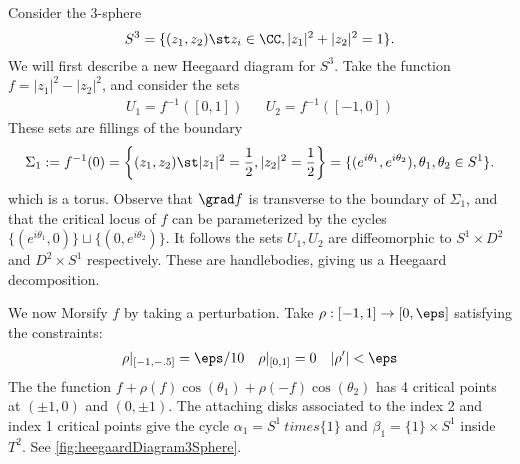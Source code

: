 

    Consider the 3-sphere 
    \[S^3=\{(z_1, z_2)\st z_i\in \CC, |z_1|^2+|z_2|^2=1\}.\]
    We will first describe a new Heegaard diagram for $S^3$. Take the function $f=|z_1|^2-|z_2|^2$, and consider the sets 
    \begin{align*}
        U_1=f^{-1}([0, 1]) && U_2=f^{-1}([-1, 0])
    \end{align*}
    These sets are fillings of the boundary 
    \[\Sigma_1:=f^{-1}(0)=\left\{(z_1, z_2)\st |z_1|^2=\frac{1}{2}, |z_2|^2=\frac{1}{2}\right\}=\{(e^{i\theta_1}, e^{i\theta_2}), \theta_1, \theta_2\in S^1\}.\]
    which is a torus. Observe that $\grad f$ is transverse to the boundary of $\Sigma_1$, and that the critical locus of $f$ can be parameterized by the cycles $\{(e^{i\theta_1}, 0)\}\sqcup \{(0, e^{i\theta_2})\}$. It follows the sets $U_1, U_2$ are diffeomorphic to $S^1\times D^2$ and $D^2\times S^1$ respectively. These are handlebodies, giving us a Heegaard decomposition.

    We now Morsify $f$ by taking a perturbation. Take $\rho:[-1, 1]\to [0, \eps]$ satisfying the constraints:
    \begin{align*}
        \rho|_{[-1, -.5]}=\eps/10 && \rho|_{[0, 1]}=0 && |\rho'|<\eps
    \end{align*}
    The the function $f+ \rho(f)\cos(\theta_1)+\rho(-f)\cos(\theta_2)$ has 4 critical points at $(\pm 1 , 0)$ and $(0, \pm 1)$. The attaching disks associated to the index 2 and index 1 critical points give the  cycle $\alpha_1=S^1\ times \{1\}$ and $\beta_1=\{1\}\times S^1$ inside $T^2$.  See \cref{fig:heegaardDiagram3Sphere}.

    
